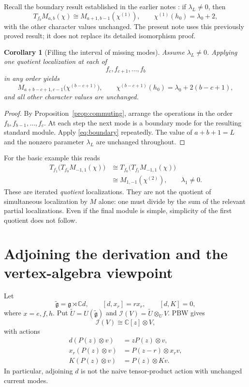 \documentclass[11pt,a4paper]{article}
\newcommand{\C}{\mathbb C}
\newcommand{\g}{\mathfrak g}
\newcommand{\I}{\mathcal I}
\theoremstyle{plainupright}
\newtheorem{corollary}[proposition]{Corollary}
\begin{document}
Recall the boundary result established in the earlier notes \cite{Boundary}:
if \(\lambda_L\ne0\), then
\begin{equation}\label{eq:boundary}
T_{f_b}M_{a,b}(\chi)\cong M_{a+1,b-1}(\chi^{(1)}),
\qquad
\chi^{(1)}(h_0)=\lambda_0+2,
\end{equation}
with the other character values unchanged. The present note uses this
previously proved result; it does not replace its detailed isomorphism proof.

\begin{corollary}[Filling the interval of missing modes]\label{cor:fill}
Assume \(\lambda_L\ne0\). Applying one quotient localization at each of
\[
f_c,f_{c+1},\ldots,f_b
\]
in any order yields
\[
M_{a+b-c+1,c-1}\bigl(\chi^{(b-c+1)}\bigr),
\qquad
\chi^{(b-c+1)}(h_0)=\lambda_0+2(b-c+1),
\]
and all other character values are unchanged.
\end{corollary}
\begin{proof}
By Proposition~\ref{prop:commuting}, arrange the operations in the
order \(f_b,f_{b-1},\ldots,f_c\). At each step the next mode is a
boundary mode for the resulting standard module.
Apply \eqref{eq:boundary} repeatedly. The value of \(a+b+1=L\)
and the nonzero parameter \(\lambda_L\) are unchanged throughout.
\end{proof}

For the basic example this reads
\begin{align*}
T_{f_1}\bigl(T_{f_0}M_{-1,1}(\chi)\bigr)
&\cong T_{f_0}\bigl(T_{f_1}M_{-1,1}(\chi)\bigr)\\
&\cong M_{1,-1}(\chi^{(2)}),\qquad \lambda_1\ne0.
\end{align*}
These are iterated \emph{quotient} localizations. They are not the
quotient of simultaneous localization by \(M\) alone: one must divide
by the sum of the relevant partial localizations.
Even if the final module is simple, simplicity of the first quotient
does not follow.

\section{Adjoining the derivation and the vertex-algebra viewpoint}

Let
\[
\widetilde{\g}=\g\rtimes\C d,\qquad
[d,x_r]=r x_r,\qquad [d,K]=0,
\]
where \(x=e,f,h\). Put \(\widetilde U=U(\widetilde{\g})\) and
\(\I(V)=\widetilde U\otimes_U V\). PBW gives
\[
\I(V)\cong\C[z]\otimes V,
\]
with actions
\begin{align*}
d(P(z)\otimes v)&=zP(z)\otimes v,\\
x_r(P(z)\otimes v)&=P(z-r)\otimes x_rv,\\
K(P(z)\otimes v)&=P(z)\otimes Kv.
\end{align*}
In particular, adjoining \(d\) is not the naive tensor-product action
with unchanged current modes.
\end{document}
